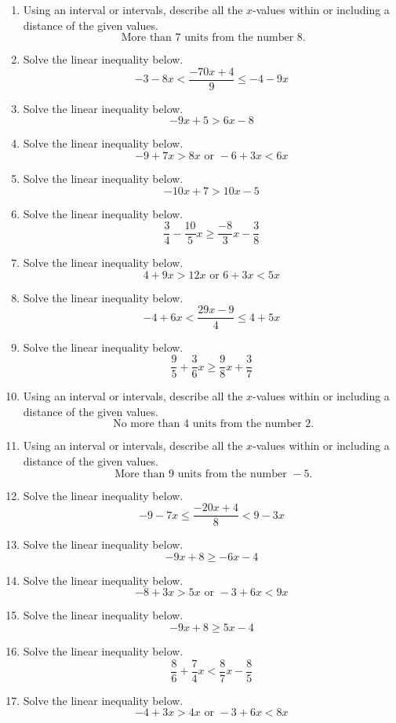 \documentclass[14pt]{extbook}
\begin{document}
\begin{enumerate}
\item{
Using an interval or intervals, describe all the $x$-values within or including a distance of the given values.\[ \text{ More than } 7 \text{ units from the number } 8. \]} \newpage
\item{
Solve the linear inequality below.\[ -3 - 8 x < \frac{-70 x + 4}{9} \leq -4 - 9 x \]} \newpage
\item{
Solve the linear inequality below.\[ -9x + 5 > 6x -8 \]} \newpage
\item{
Solve the linear inequality below.\[ -9 + 7 x > 8 x \text{ or } -6 + 3 x < 6 x \]} \newpage
\item{
Solve the linear inequality below.\[ -10x + 7 > 10x -5 \]} \newpage
\item{
Solve the linear inequality below.\[ \frac{3}{4} - \frac{10}{5} x \geq \frac{-8}{3} x - \frac{3}{8} \]} \newpage
\item{
Solve the linear inequality below.\[ 4 + 9 x > 12 x \text{ or } 6 + 3 x < 5 x \]} \newpage
\item{
Solve the linear inequality below.\[ -4 + 6 x < \frac{29 x - 9}{4} \leq 4 + 5 x \]} \newpage
\item{
Solve the linear inequality below.\[ \frac{9}{5} + \frac{3}{6} x \geq \frac{9}{8} x + \frac{3}{7} \]} \newpage
\item{
Using an interval or intervals, describe all the $x$-values within or including a distance of the given values.\[ \text{ No more than } 4 \text{ units from the number } 2. \]} \newpage
\item{
Using an interval or intervals, describe all the $x$-values within or including a distance of the given values.\[ \text{ More than } 9 \text{ units from the number } -5. \]} \newpage
\item{
Solve the linear inequality below.\[ -9 - 7 x \leq \frac{-20 x + 4}{8} < 9 - 3 x \]} \newpage
\item{
Solve the linear inequality below.\[ -9x + 8 \geq -6x -4 \]} \newpage
\item{
Solve the linear inequality below.\[ -8 + 3 x > 5 x \text{ or } -3 + 6 x < 9 x \]} \newpage
\item{
Solve the linear inequality below.\[ -9x + 8 \geq 5x -4 \]} \newpage
\item{
Solve the linear inequality below.\[ \frac{8}{6} + \frac{7}{4} x < \frac{8}{7} x - \frac{8}{5} \]} \newpage
\item{
Solve the linear inequality below.\[ -4 + 3 x > 4 x \text{ or } -3 + 6 x < 8 x \]} \newpage

\end{enumerate}
\end{document}
